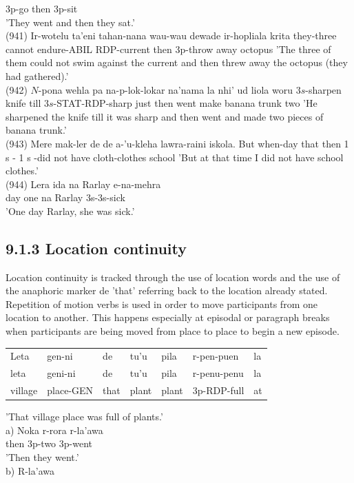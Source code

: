 \documentclass[10pt]{article}
\begin{document}
3p-go then 3p-sit\\
'They went and then they sat.'\\
(941) Ir-wotelu ta'eni tahan-nana wau-wau dewade ir-hopliala krita they-three cannot endure-ABIL RDP-current then 3p-throw away octopus 'The three of them could not swim against the current and then threw away the octopus (they had gathered).'\\
(942) \(N\)-pona wehla pa na-p-lok-lokar na'nama la nhi' ud liola woru \(3 s\)-sharpen knife till \(3 s\)-STAT-RDP-sharp just then went make banana trunk two 'He sharpened the knife till it was sharp and then went and made two pieces of banana trunk.'\\
(943) Mere mak-ler de de a-'u-kleha lawra-raini iskola. But when-day that then 1 s - 1 s -did not have cloth-clothes school 'But at that time I did not have school clothes.'\\
(944) Lera ida na Rarlay e-na-mehra\\
day one na Rarlay 3s-3s-sick\\
'One day Rarlay, she was sick.'

\subsection*{9.1.3 Location continuity}
Location continuity is tracked through the use of location words and the use of the anaphoric marker de 'that' referring back to the location already stated. Repetition of motion verbs is used in order to move participants from one location to another. This happens especially at episodal or paragraph breaks when participants are being moved from place to place to begin a new episode.

\begin{center}
\begin{tabular}{lllllll}
Leta & gen-ni & de & tu'u & pila & r-pen-puen & la \\
leta & geni-ni & de & tu'u & pila & r-penu-penu & la \\
village & place-GEN & that & plant & plant & 3p-RDP-full & at \\
\end{tabular}
\end{center}

'That village place was full of plants.'\\
a) Noka r-rora r-la'awa\\
then 3p-two 3p-went\\
'Then they went.'\\
b) R-la'awa
\end{document}
